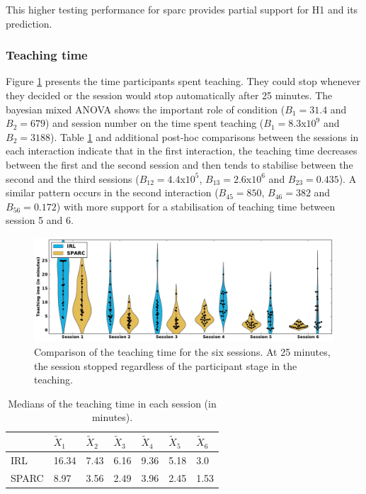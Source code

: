 This higher testing performance for \gls{sparc} provides partial support for H1 and its prediction.

\subsubsection{Teaching time}

Figure \ref{fig:control_time} presents the time participants spent teaching. They could stop whenever they decided or the  session would stop automatically after 25 minutes. The bayesian mixed ANOVA shows the important role of condition ($B_1=31.4$ and $B_2 = 679$) and session number on the time spent teaching ($B_1=8.3$x$10^9$ and $B_2 = 3188$). Table \ref{tab:control_time} and additional post-hoc comparisons between the sessions in each interaction indicate that in the first interaction, the teaching time decreases between the first and the second session and then tends to stabilise between the second and the third sessions ($B_{12}=4.4$x$10^5$, $B_{13}=2.6$x$10^6$ and $B_{23}=0.435$). A similar pattern occurs in the second interaction ($B_{45}=850$, $B_{46}=382$ and $B_{56}=0.172$) with more support for a stabilisation of teaching time between session 5 and 6.

\begin{figure}[ht]
	\includegraphics[width=\textwidth]{time.pdf}
	\centering
	\caption{Comparison of the teaching time for the six sessions. At 25 minutes, the session stopped regardless of the participant stage in the teaching.
	}
	\label{fig:control_time}
\end{figure}

\begin{table}[ht]
	\centering
	\caption{Medians of the teaching time in each session (in minutes).}
	\label{tab:control_time}
	\begin{tabular}{@{}lllllll@{}}\toprule
		& $\widetilde{X}_{1}$ & $\widetilde{X}_{2}$ & $\widetilde{X}_{3}$ & $\widetilde{X}_{4}$ & $\widetilde{X}_{5}$ & $\widetilde{X}_{6}$\\ 
		\midrule
    IRL & 16.34 & 7.43 & 6.16 & 9.36 & 5.18 & 3.0\\
    SPARC & 8.97 & 3.56 & 2.49 & 3.96 & 2.45 & 1.53\\
    \bottomrule
	\end{tabular}
\end{table}

